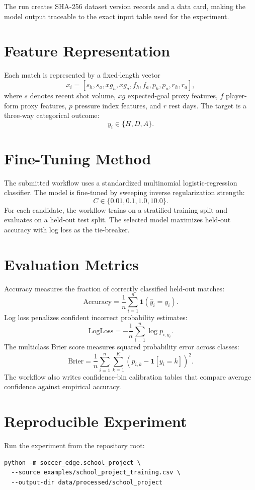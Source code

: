 \documentclass[11pt]{article}
\begin{document}
The run creates SHA-256 dataset version records and a data card, making the model output traceable to the exact input table used for the experiment.

\section{Feature Representation}
Each match is represented by a fixed-length vector
\[
  x_i = [s_h, s_a, xg_h, xg_a, f_h, f_a, p_h, p_a, r_h, r_a],
\]
where $s$ denotes recent shot volume, $xg$ expected-goal proxy features, $f$ player-form proxy features, $p$ pressure index features, and $r$ rest days. The target is a three-way categorical outcome:
\[
  y_i \in \{H, D, A\}.
\]

\section{Fine-Tuning Method}
The submitted workflow uses a standardized multinomial logistic-regression classifier. The model is fine-tuned by sweeping inverse regularization strength:
\[
  C \in \{0.01, 0.1, 1.0, 10.0\}.
\]
For each candidate, the workflow trains on a stratified training split and evaluates on a held-out test split. The selected model maximizes held-out accuracy with log loss as the tie-breaker.

\section{Evaluation Metrics}
Accuracy measures the fraction of correctly classified held-out matches:
\[
  \text{Accuracy}=\frac{1}{n}\sum_{i=1}^{n}\mathbf{1}(\hat{y}_i=y_i).
\]
Log loss penalizes confident incorrect probability estimates:
\[
  \text{LogLoss}=-\frac{1}{n}\sum_{i=1}^{n}\log p_{i,y_i}.
\]
The multiclass Brier score measures squared probability error across classes:
\[
  \text{Brier}=\frac{1}{n}\sum_{i=1}^{n}\sum_{k=1}^{K}(p_{i,k}-\mathbf{1}[y_i=k])^2.
\]
The workflow also writes confidence-bin calibration tables that compare average confidence against empirical accuracy.

\section{Reproducible Experiment}
Run the experiment from the repository root:
\begin{verbatim}
python -m soccer_edge.school_project \
  --source examples/school_project_training.csv \
  --output-dir data/processed/school_project
\end{verbatim}
\end{document}
